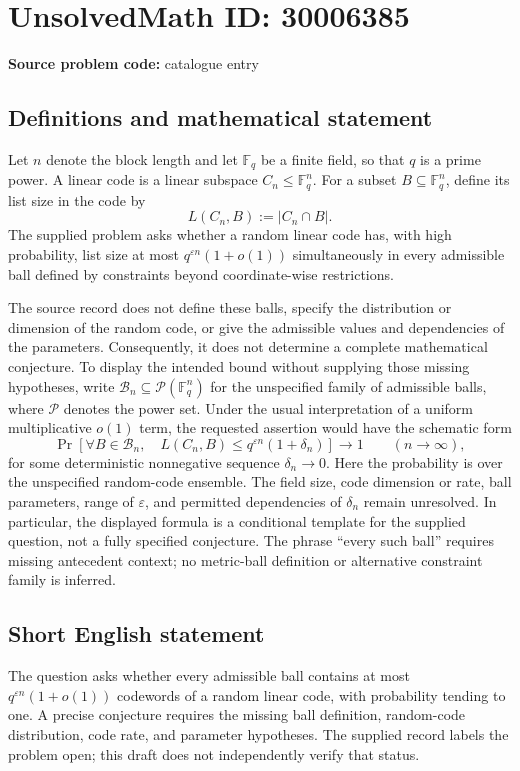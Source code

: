 \documentclass[11pt]{article}
\newcommand{\F}{\mathbb{F}}
\begin{document}
\section*{UnsolvedMath ID: 30006385}
\textbf{Source problem code:} catalogue entry
\subsection{Definitions and mathematical statement}
Let \(n\) denote the block length and let \(\F_q\) be a finite field, so that \(q\) is a prime power. A linear code is a linear subspace \(C_n\leq \F_q^n\). For a subset \(B\subseteq\F_q^n\), define its list size in the code by
\[
L(C_n,B):=|C_n\cap B|.
\]
The supplied problem asks whether a random linear code has, with high probability, list size at most \(q^{\varepsilon n}(1+o(1))\) simultaneously in every admissible ball defined by constraints beyond coordinate-wise restrictions.

The source record does not define these balls, specify the distribution or dimension of the random code, or give the admissible values and dependencies of the parameters. Consequently, it does not determine a complete mathematical conjecture. To display the intended bound without supplying those missing hypotheses, write \(\mathcal B_n\subseteq\mathcal P(\F_q^n)\) for the unspecified family of admissible balls, where \(\mathcal P\) denotes the power set. Under the usual interpretation of a uniform multiplicative \(o(1)\) term, the requested assertion would have the schematic form
\[
\Pr\!\left[
  \forall B\in\mathcal B_n,\quad
  L(C_n,B)\leq q^{\varepsilon n}(1+\delta_n)
\right]\longrightarrow 1
\qquad(n\longrightarrow\infty),
\]
for some deterministic nonnegative sequence \(\delta_n\to0\). Here the probability is over the unspecified random-code ensemble. The field size, code dimension or rate, ball parameters, range of \(\varepsilon\), and permitted dependencies of \(\delta_n\) remain unresolved. In particular, the displayed formula is a conditional template for the supplied question, not a fully specified conjecture. The phrase ``every such ball'' requires missing antecedent context; no metric-ball definition or alternative constraint family is inferred.
\subsection{Short English statement}
The question asks whether every admissible ball contains at most \(q^{\varepsilon n}(1+o(1))\) codewords of a random linear code, with probability tending to one. A precise conjecture requires the missing ball definition, random-code distribution, code rate, and parameter hypotheses. The supplied record labels the problem open; this draft does not independently verify that status.
\end{document}
